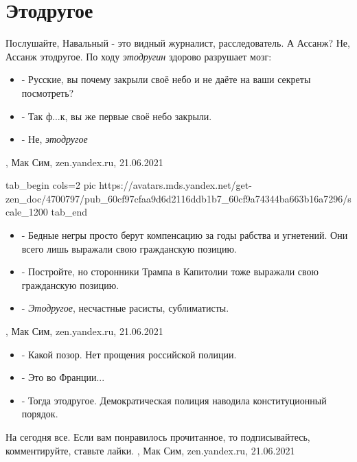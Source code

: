  
 
 
 
 
\chapter{Этодругое}

Послушайте, Навальный - это видный журналист, расследователь. А Ассанж? Не, Ассанж этодругое.
По ходу \emph{этодругин} здорово разрушает мозг:
\begin{itemize}
  \item - Русские, вы почему закрыли своё небо и не даёте на ваши секреты посмотреть?
  \item - Так ф...к, вы же первые своё небо закрыли.
  \item - Не, \emph{этодругое}
\end{itemize}
 , 
 Мак Сим, zen.yandex.ru, 21.06.2021

 \ifcmt
   tab_begin cols=2
      pic https://avatars.mds.yandex.net/get-zen_doc/4700797/pub_60cf97cfaa9d6d2116ddb1b7_60cf9a74344ba663b16a7296/scale_1200
   tab_end
 \fi
\begin{itemize}
  \item - Бедные негры просто берут компенсацию за годы рабства и угнетений. Они всего лишь выражали свою гражданскую позицию.
  \item - Постройте, но сторонники Трампа в Капитолии тоже выражали свою гражданскую позицию.
  \item - \emph{Этодругое}, несчастные расисты, сублиматисты. 
\end{itemize}
 , 
 Мак Сим, zen.yandex.ru, 21.06.2021

\begin{itemize}
  \item - Какой позор. Нет прощения российской полиции.
  \item - Это во Франции...
  \item - Тогда этодругое. Демократическая полиция наводила конституционный порядок.
\end{itemize}
На сегодня все. Если вам понравилось прочитанное, то подписывайтесь, комментируйте, ставьте лайки. 
 , 
 Мак Сим, zen.yandex.ru, 21.06.2021

